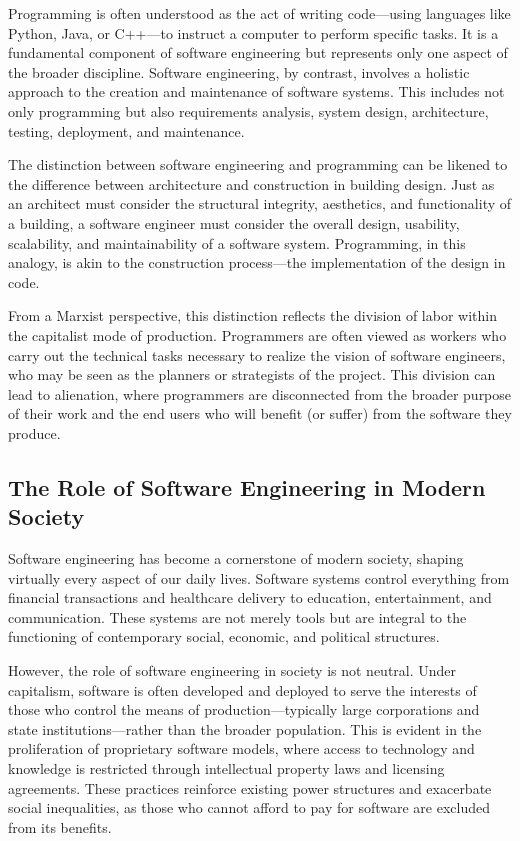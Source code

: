 \begin{refsection}
\begin{multicols}{2}
{Programming is often understood as the act of writing code—using languages like Python, Java, or C++—to instruct a computer to perform specific tasks. It is a fundamental component of software engineering but represents only one aspect of the broader discipline. Software engineering, by contrast, involves a holistic approach to the creation and maintenance of software systems. This includes not only programming but also requirements analysis, system design, architecture, testing, deployment, and maintenance.

The distinction between software engineering and programming can be likened to the difference between architecture and construction in building design. Just as an architect must consider the structural integrity, aesthetics, and functionality of a building, a software engineer must consider the overall design, usability, scalability, and maintainability of a software system. Programming, in this analogy, is akin to the construction process—the implementation of the design in code.

From a Marxist perspective, this distinction reflects the division of labor within the capitalist mode of production. Programmers are often viewed as workers who carry out the technical tasks necessary to realize the vision of software engineers, who may be seen as the planners or strategists of the project. This division can lead to alienation, where programmers are disconnected from the broader purpose of their work and the end users who will benefit (or suffer) from the software they produce.

\subsection{The Role of Software Engineering in Modern Society}

Software engineering has become a cornerstone of modern society, shaping virtually every aspect of our daily lives. Software systems control everything from financial transactions and healthcare delivery to education, entertainment, and communication. These systems are not merely tools but are integral to the functioning of contemporary social, economic, and political structures.

However, the role of software engineering in society is not neutral. Under capitalism, software is often developed and deployed to serve the interests of those who control the means of production—typically large corporations and state institutions—rather than the broader population. This is evident in the proliferation of proprietary software models, where access to technology and knowledge is restricted through intellectual property laws and licensing agreements. These practices reinforce existing power structures and exacerbate social inequalities, as those who cannot afford to pay for software are excluded from its benefits.

}
\end{multicols}
\end{refsection}
